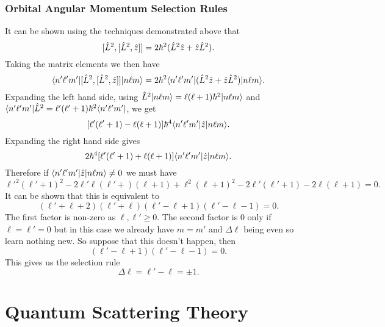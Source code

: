 \documentclass[a4paper]{article}
\renewcommand{\ket}[1]{\vert {#1} \rangle}
\renewcommand{\bra}[1]{\langle {#1} \vert}
\begin{document}
    \subsubsection{Orbital Angular Momentum Selection Rules}
    It can be shown using the techniques demonstrated above that
    \[[\hat{L}^2, [\hat{L}^2, \hat{z}]] = 2\hbar^2(\hat{L}^2\hat{z} + \hat{z}\hat{L}^2).\]
    Taking the matrix elements we then have
    \[\bra{n'\ell'm'}[\operator{L}^2, [\operator{L}^2, \operator{z}]]\ket{n\ell m} = 2\hbar^2\bra{n'\ell'm'}(\operator{L}^2\operator{z} + \operator{z}\operator{L}^2)\ket{n\ell m}.\]
    Expanding the left hand side, using \(\operator{L}^2\ket{n\ell m} = \ell(\ell + 1)\hbar^2\ket{n\ell m}\) and \(\bra{n'\ell'm'}\operator{L}^2 = \ell'(\ell' + 1)\hbar^2\bra{n'\ell'm'}\), we get
    \[[\ell'(\ell' + 1) - \ell(\ell + 1)]\hbar^4\bra{n'\ell'm'}\operator{z}\ket{n\ell m}.\]
    Expanding the right hand side gives
    \[2\hbar^4[\ell'(\ell' + 1) + \ell(\ell + 1)]\bra{n'\ell'm'}\operator{z}\ket{n\ell m}.\]
    Therefore if \(\bra{n'\ell'm'}\operator{z}\ket{n\ell m} \ne 0\) we must have
    \[\ell'^2(\ell' + 1)^2 - 2\ell'\ell(\ell' + )(\ell + 1) + \ell^2(\ell + 1)^2 - 2\ell'(\ell' + 1) - 2\ell(\ell + 1) = 0.\]
    It can be shown that this is equivalent to
    \[(\ell' + \ell + 2)(\ell' + \ell)(\ell' - \ell + 1)(\ell' - \ell - 1) = 0.\]
    The first factor is non-zero as \(\ell, \ell' \ge 0\).
    The second factor is 0 only if \(\ell = \ell' = 0\) but in this case we already have \(m = m'\) and \(\Delta\ell\) being even so learn nothing new.
    So suppose that this doesn't happen, then
    \[(\ell' - \ell + 1)(\ell' - \ell - 1) = 0.\]
    This gives us the selection rule
    \[\Delta\ell = \ell' - \ell = \pm 1.\]
    
    \section{Quantum Scattering Theory}
    
\end{document}
